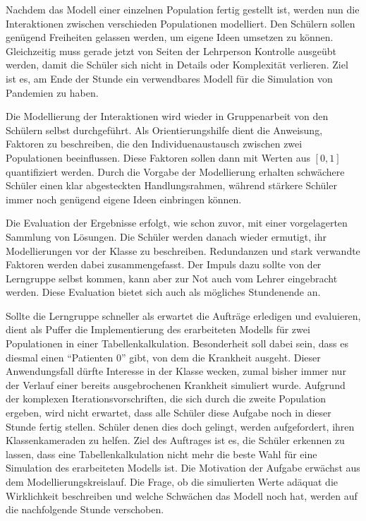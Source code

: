 Nachdem das Modell einer einzelnen Population fertig gestellt ist, werden nun die Interaktionen zwischen verschieden Populationen modelliert. Den Schülern sollen genügend Freiheiten gelassen werden, um eigene Ideen umsetzen zu können. Gleichzeitig muss gerade jetzt von Seiten der Lehrperson Kontrolle ausgeübt werden, damit die Schüler sich nicht in Details oder Komplexität verlieren. Ziel ist es, am Ende der Stunde ein verwendbares Modell für die Simulation von Pandemien zu haben. 

Die Modellierung der Interaktionen wird wieder in Gruppenarbeit von den Schülern selbst durchgeführt. Als Orientierungshilfe dient die Anweisung, Faktoren zu beschreiben, die den Individuenaustausch zwischen zwei Populationen beeinflussen. Diese Faktoren sollen dann mit Werten aus $[0,1]$ quantifiziert werden. Durch die Vorgabe der Modellierung erhalten schwächere Schüler einen klar abgesteckten Handlungsrahmen, während stärkere Schüler immer noch genügend eigene Ideen einbringen können. 

Die Evaluation der Ergebnisse erfolgt, wie schon zuvor, mit einer vorgelagerten Sammlung von Lösungen. Die Schüler werden danach wieder ermutigt, ihr Modellierungen vor der Klasse zu beschreiben. Redundanzen und stark verwandte Faktoren werden dabei zusammengefasst. Der Impuls dazu sollte von der Lerngruppe selbst kommen, kann aber zur Not auch vom Lehrer eingebracht werden. Diese Evaluation bietet sich auch als mögliches Stundenende an. 

Sollte die Lerngruppe schneller als erwartet die Aufträge erledigen und evaluieren, dient als Puffer die Implementierung des erarbeiteten Modells für zwei Populationen in einer Tabellenkalkulation. Besonderheit soll dabei sein, dass es diesmal einen ``Patienten 0'' gibt, von dem die Krankheit ausgeht. Dieser Anwendungsfall dürfte Interesse in der Klasse wecken, zumal bisher immer nur der Verlauf einer bereits ausgebrochenen Krankheit simuliert wurde. Aufgrund der komplexen Iterationsvorschriften, die sich durch die zweite Population ergeben, wird nicht erwartet, dass alle Schüler diese Aufgabe noch in dieser Stunde fertig stellen. Schüler denen dies doch gelingt, werden aufgefordert, ihren Klassenkameraden zu helfen. Ziel des Auftrages ist es, die Schüler erkennen zu lassen, dass eine Tabellenkalkulation nicht mehr die beste Wahl für eine Simulation des erarbeiteten Modells ist. Die Motivation der Aufgabe erwächst aus dem Modellierungskreislauf. Die Frage, ob die simulierten Werte adäquat die Wirklichkeit beschreiben und welche Schwächen das Modell noch hat, werden auf die nachfolgende Stunde verschoben.

